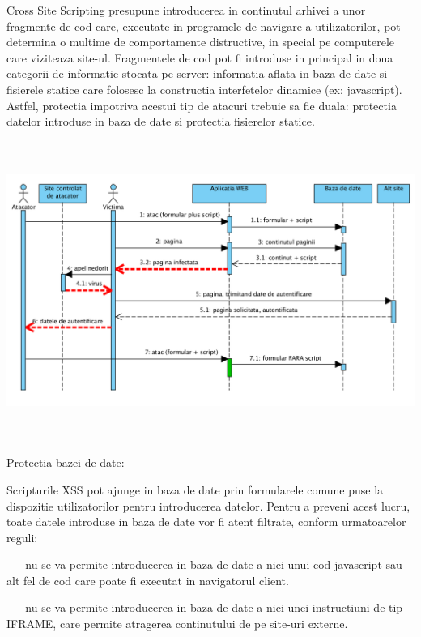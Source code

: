 \bigskip

{\sffamily\color{black}
Cross Site Scripting presupune introducerea in continutul arhivei a unor fragmente de cod care, executate in programele
de navigare a utilizatorilor, pot determina o multime de comportamente distructive, in special pe computerele care
viziteaza site-ul. Fragmentele de cod pot fi introduse in principal in doua categorii de informatie stocata pe server:
informatia aflata in baza de date si fisierele statice care folosesc la constructia interfetelor dinamice (ex:
javascript). Astfel, protectia impotriva acestui tip de atacuri trebuie sa fie duala: protectia datelor introduse in
baza de date si protectia fisierelor statice. }


\bigskip

 \includegraphics[width=6.7602in,height=3.8437in]{SecuritateaarhiveiRODA-img004.png} 


\bigskip

{\sffamily\color{black}
Protectia bazei de date: }

\bigskip

{\sffamily\color{black}
Scripturile XSS pot ajunge in baza de date prin formularele comune puse la dispozitie utilizatorilor pentru introducerea
datelor. Pentru a preveni acest lucru, toate datele introduse in baza de date vor fi atent filtrate, conform
urmatoarelor reguli:}

{\sffamily\color{black}
\ \ {}- nu se va permite introducerea in baza de date a nici unui cod javascript sau alt fel de cod care poate fi
executat in navigatorul client. }

{\sffamily\color{black}
\ \ {}- nu se va permite introducerea in baza de date a nici unei instructiuni de tip IFRAME, care permite atragerea
continutului de pe site-uri externe. }

